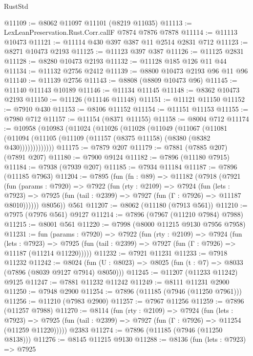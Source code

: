 \begin{lexlean}{RustStd}
\begin{coremodule}
{\begin{coremodule}
{{{{{{{{{{{{{{{{{{{{{{{{{{{{{{{{{{{{{{{{{{{{{{{{{{@11109 := @8062 @11097 @11101 (@8219 @11035)
@11113 := LexLeanPreservation.Rust.Corr.callF @7874 @7876 @7878
@11114 := @11113 @10473
@11121 := @11114 @430 @397 @387 @11 @2514 @2831 @712
@11123 := @8271 @10473 @2193
@11125 := @11123 @397 @387
@11126 := @11125 @2831
@11128 := @8280 @10473 @2193
@11132 := @11128 @185 @126 @11 @44
@11134 := @11132 @2756 @2412
@11139 := @8800 @10473 @2193 @96 @11 @96
@11140 := @11139 @2756
@11143 := @8808 (@8809 @10473 @96)
@11145 := @11140 @11143 @10189
@11146 := @11134 @11145
@11148 := @8362 @10473 @2193
@11150 := @11126 (@11146 @11148)
@11151 := @11121 @11150
@11152 := @7910 @430
@11153 := @8106 @11152
@11154 := @11151 @11153
@11155 := @7980 @712
@11157 := @11154 (@8371 @11155)
@11158 := @8004 @712
@11174 := @10958
    (@10983
      (@11024
        (@11026
          (@11028
            (@11049
              (@11067
                (@11081
                  (@11094 (@11105 (@11109 (@11157 (@8375 @11158) (@8380 (@8382 @430)))))))))))))
@11175 := @7879 @207
@11179 := @7881 (@7885 @207) (@7891 @207)
@11180 := @7900 @9124
@11182 := @7896 (@11180 @7915)
@11184 := @7938 (@7939 @207)
@11185 := @7934 @11184
@11187 := @7896 (@11185 @7963)
@11204 := @7895
    (fun (fn : @89) =>
    @11182
      (@7918
        (@7921
          (fun (params : @7920) =>
          @7922
            (fun (rty : @2109) =>
            @7924
              (fun (lets : @7923) =>
              @7925 (fun (tail : @2399) => @7927 (fun (Γ : @7926) => @11187 @8010))))))
        @8056))
    @561
@11207 := @8062 (@11180 (@7913 @561))
@11210 := @7975 (@7976 @561) @9127
@11214 := @7896 (@7967 (@11210 @7984) @7988)
@11215 := @8001 @561
@11220 := @7998 (@8000 @11215 @9130 @7956 @7958)
@11231 := fun (params : @7920) =>
  @7922
    (fun (rty : @2109) =>
    @7924
      (fun (lets : @7923) =>
      @7925 (fun (tail : @2399) => @7927 (fun (Γ : @7926) => @11187 (@11214 @11220)))))
@11232 := @7921 @11231
@11233 := @7918 @11232
@11242 := @8024 (fun (U : @8023) => @8025 (fun (t : @7) => @8033 (@7896 (@8039 @9127 @7914) @8050)))
@11245 := @11207 (@11233 @11242) @9125
@11247 := @7881 @11232 @11242
@11249 := @8111 @11231 @2900
@11250 := @7948 @2900
@11254 := @7896 (@11185 (@7946 (@11250 @7961)))
@11256 := @11210 (@7983 @2900)
@11257 := @7967 @11256
@11259 := @7896 (@11257 @7988)
@11270 := @8114
    (fun (rty : @2109) =>
    @7924
      (fun (lets : @7923) =>
      @7925 (fun (tail : @2399) => @7927 (fun (Γ : @7926) => @11254 (@11259 @11220)))))
    @2383
@11274 := @7896 (@11185 (@7946 (@11250 @8138)))
@11276 := @8145 @11215 @9130
@11288 := @8136
    (fun (lets : @7923) =>
    @7925
}}}}}}}}}}}}}}}}}}}}}}}}}}}}}}}}}}}}}}}}}}}}}}}}}}
\end{coremodule}}
\end{coremodule}
\end{lexlean}
